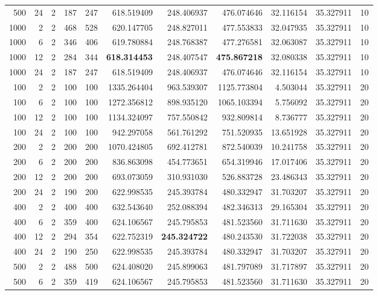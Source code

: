 \begin{table}
\begin{tabular}{rrrrrrrrrrr}
500 & 24 & 2 & 187 & 247 & 618.519409 & 248.406937 & 476.074646 & 32.116154 & 35.327911 & 10 \\
1000 & 2 & 2 & 468 & 528 & 620.147705 & 248.827011 & 477.553833 & 32.047935 & 35.327911 & 10 \\
1000 & 6 & 2 & 346 & 406 & 619.780884 & 248.768387 & 477.276581 & 32.063087 & 35.327911 & 10 \\
1000 & 12 & 2 & 284 & 344 & \textbf{618.314453} & 248.407547 & \textbf{475.867218} & 32.080338 & 35.327911 & 10 \\
1000 & 24 & 2 & 187 & 247 & 618.519409 & 248.406937 & 476.074646 & 32.116154 & 35.327911 & 10 \\
100 & 2 & 2 & 100 & 100 & 1335.264404 & 963.539307 & 1125.773804 & 4.503044 & 35.327911 & 20 \\
100 & 6 & 2 & 100 & 100 & 1272.356812 & 898.935120 & 1065.103394 & 5.756092 & 35.327911 & 20 \\
100 & 12 & 2 & 100 & 100 & 1134.324097 & 757.550842 & 932.809814 & 8.736777 & 35.327911 & 20 \\
100 & 24 & 2 & 100 & 100 & 942.297058 & 561.761292 & 751.520935 & 13.651928 & 35.327911 & 20 \\
200 & 2 & 2 & 200 & 200 & 1070.424805 & 692.412781 & 872.540039 & 10.241758 & 35.327911 & 20 \\
200 & 6 & 2 & 200 & 200 & 836.863098 & 454.773651 & 654.319946 & 17.017406 & 35.327911 & 20 \\
200 & 12 & 2 & 200 & 200 & 693.073059 & 310.931030 & 526.883728 & 23.486343 & 35.327911 & 20 \\
200 & 24 & 2 & 190 & 200 & 622.998535 & 245.393784 & 480.332947 & 31.703207 & 35.327911 & 20 \\
400 & 2 & 2 & 400 & 400 & 632.543640 & 252.088394 & 482.346313 & 29.165304 & 35.327911 & 20 \\
400 & 6 & 2 & 359 & 400 & 624.106567 & 245.795853 & 481.523560 & 31.711630 & 35.327911 & 20 \\
400 & 12 & 2 & 294 & 354 & 622.752319 & \textbf{245.324722} & 480.243530 & 31.722038 & 35.327911 & 20 \\
400 & 24 & 2 & 190 & 250 & 622.998535 & 245.393784 & 480.332947 & 31.703207 & 35.327911 & 20 \\
500 & 2 & 2 & 488 & 500 & 624.408020 & 245.899063 & 481.797089 & 31.717897 & 35.327911 & 20 \\
500 & 6 & 2 & 359 & 419 & 624.106567 & 245.795853 & 481.523560 & 31.711630 & 35.327911 & 20 \\

\end{tabular}
\end{table}
